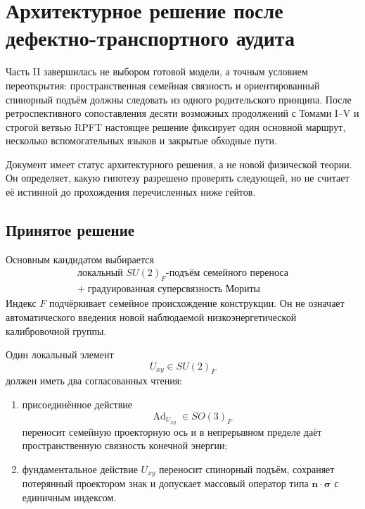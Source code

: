 \chapter{Архитектурное решение после дефектно-транспортного аудита}

Часть II завершилась не выбором готовой модели, а точным условием
переоткрытия: пространственная семейная связность и ориентированный
спинорный подъём должны следовать из одного родительского принципа. После
ретроспективного сопоставления десяти возможных продолжений с Томами I--V
и строгой ветвью RPFT настоящее решение фиксирует один основной маршрут,
несколько вспомогательных языков и закрытые обходные пути.

Документ имеет статус архитектурного решения, а не новой физической
теории. Он определяет, какую гипотезу разрешено проверять следующей, но не
считает её истинной до прохождения перечисленных ниже гейтов.

\section{Принятое решение}

Основным кандидатом выбирается
\begin{equation}
 \boxed{
 \begin{gathered}
 \text{локальный }SU(2)_F\text{-подъём семейного переноса}
 \\
 +\;\text{градуированная суперсвязность Мориты}
 \end{gathered}}
 \label{eq:v5-decision-main-route}
\end{equation}
Индекс $F$ подчёркивает семейное происхождение конструкции. Он не означает
автоматического введения новой наблюдаемой низкоэнергетической
калибровочной группы.

Один локальный элемент
\begin{equation}
 U_{xy}\in SU(2)_F
\end{equation}
должен иметь два согласованных чтения:
\begin{enumerate}
 \item присоединённое действие
 \begin{equation}
  \operatorname{Ad}_{U_{xy}}\in SO(3)_F
 \end{equation}
 переносит семейную проекторную ось и в непрерывном пределе даёт
 пространственную связность конечной энергии;
 \item фундаментальное действие $U_{xy}$ переносит спинорный подъём,
 сохраняет потерянный проектором знак и допускает массовый оператор типа
 $\mathbf n\cdot\boldsymbol\sigma$ с единичным индексом.
\end{enumerate}


